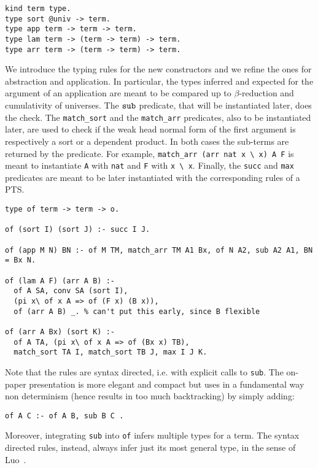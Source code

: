 \documentclass{easychair}
\begin{document}
\begin{verbatim}
kind term type.
type sort @univ -> term.
type app term -> term -> term.
type lam term -> (term -> term) -> term.
type arr term -> (term -> term) -> term.
\end{verbatim}

We introduce the typing rules for the new constructors and we refine the
ones for abstraction and application. In particular, the types inferred and
expected for the argument of an application are meant to be compared up to $\beta$-reduction and cumulativity of universes. The $\verb+sub+$ predicate, that will be instantiated later, does the check. The \verb+match_sort+ and the \verb+match_arr+ predicates, also to be instantiated later, are used to check if the weak head normal form of the first argument is respectively a sort or a dependent product. In both cases the sub-terms are returned by the predicate. For example, \verb+match_arr (arr nat x \ x) A F+ is meant to instantiate \verb+A+ with \verb+nat+ and \verb+F+ with \verb+x \ x+. Finally, the \verb+succ+ and \verb+max+ predicates are meant to be later instantiated with the corresponding rules of a PTS.

\begin{verbatim}
type of term -> term -> o.

of (sort I) (sort J) :- succ I J.

of (app M N) BN :- of M TM, match_arr TM A1 Bx, of N A2, sub A2 A1, BN = Bx N.

of (lam A F) (arr A B) :-
  of A SA, conv SA (sort I),
  (pi x\ of x A => of (F x) (B x)),
  of (arr A B) _. % can't put this early, since B flexible

of (arr A Bx) (sort K) :-
  of A TA, (pi x\ of x A => of (Bx x) TB),
  match_sort TA I, match_sort TB J, max I J K.
\end{verbatim}

Note that the rules are syntax directed, i.e. with explicit calls to
\verb+sub+.  The on-paper presentation is more elegant and compact but 
uses in a fundamental way non determinism (hence results in too much
backtracking) by simply adding:

\begin{verbatim}
of A C :- of A B, sub B C .
\end{verbatim}

Moreover, integrating \verb+sub+ into \verb+of+ infers multiple types for a term. The syntax directed rules, instead, always infer just its most general type, in the sense of Luo~\cite{ecc}.
\end{document}
